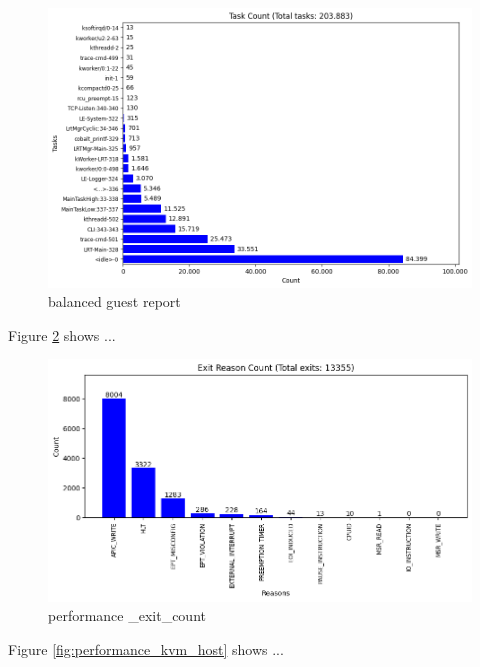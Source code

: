 \documentclass[MMR,Master,english]{twbook}
\begin{document}
\begin{figure}[H]
	\centering
	\includegraphics[width=1.0\columnwidth]{img/balanced/results_guest_report.png}
	\caption[balanced guest report]{balanced guest report}
	\label{fig:balanced_kvm_guest}
\end{figure}
\clearpage



Figure \ref{fig:performance_kvm_exit} shows ...

\begin{figure}[H]
	\centering
	\includegraphics[width=1.0\columnwidth]{img/performance/kvm_exit_count.png}
	\caption[performance \_exit\_count]{performance \_exit\_count}
	\label{fig:performance_kvm_exit}
\end{figure}
\clearpage


Figure \ref{fig:performance_kvm_host} shows ...
\end{document}
